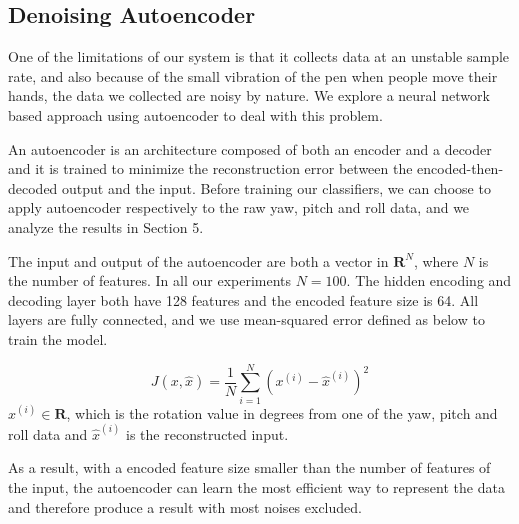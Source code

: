 \documentclass{article}
\newcommand{\xsi}{x^{(i)}}
\begin{document}
\begin{multicols*}{2}
\subsection{Denoising Autoencoder}

One of the limitations of our system is that it collects data at an unstable sample rate, and also because of the small vibration of the pen when people move their hands, the data we collected are noisy by nature. We explore a neural network based approach using autoencoder to deal with this problem.


An autoencoder is an architecture composed of both an encoder and a decoder and it is trained to minimize the reconstruction error between the encoded-then-decoded output and the input. Before training our classifiers, we can choose to apply autoencoder respectively to the raw yaw, pitch and roll data, and we analyze the results in Section 5.

The input and output of the autoencoder are both a vector in $\mathbf{R}^N$, where $N$ is the number of features. In all our experiments $N=100$. The hidden encoding and decoding layer both have 128 features and the encoded feature size is 64. All layers are fully connected, and we use mean-squared error defined as below to train the model.

\[
J(x, \hat{x}) = \frac{1}{N} \sum_{i=1}^N (\xsi - \hat{x}^{(i)})^2
\]
$\xsi \in \mathbf{R}$, which is the rotation value in degrees from one of the yaw, pitch and roll data and $\hat{x}^{(i)}$ is the reconstructed input.


As a result, with a encoded feature size smaller than the number of features of the input, the autoencoder can learn the most efficient way to represent the data and therefore produce a result with most noises excluded.


\end{multicols*}
\end{document}
